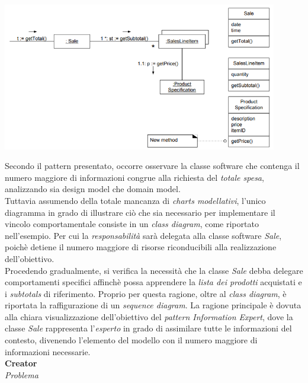 \documentclass{article}
\begin{document}
\begin{center}
    \includegraphics*[width=0.9\textwidth]{foto 1.png}
\end{center}\vspace*{7pt}
Secondo il pattern presentato, occorre osservare la classe software che contenga il numero maggiore di informazioni congrue alla richiesta del \textit{totale spesa}, analizzando sia design model che domain model.\vspace*{7pt}\\
Tuttavia assumendo della totale mancanza di \textit{charts modellativi}, l'unico diagramma in grado di illustrare ciò che sia necessario per implementare il vincolo comportamentale consiste in un \textit{class diagram}, come riportato nell'esempio. Per cui la \textit{responsabilità} sarà delegata alla classe software \textit{Sale}, poichè detiene il numero maggiore di risorse riconducibili alla realizzazione dell'obiettivo.\vspace*{7pt}\\
Procedendo gradualmente, si verifica la necessità che la classe \textit{Sale} debba delegare comportamenti specifici affinchè possa apprendere la \textit{lista dei prodotti} acquistati e i \textit{subtotals} di riferimento. Proprio per questa ragione, oltre al \textit{class diagram}, è riportata la raffigurazione di un \textit{sequence diagram}. La ragione principale è dovuta alla chiara visualizzazione dell'obiettivo del \textit{pattern Information Expert}, dove la classe \textit{Sale} rappresenta l'\textit{esperto} in grado di assimilare tutte le informazioni del contesto, divenendo l'elemento del modello con il numero maggiore di informazioni necessarie.\vspace*{7pt}\\
\textbf{Creator}\vspace*{7pt}\\
\textit{Problema}\\
\end{document}
